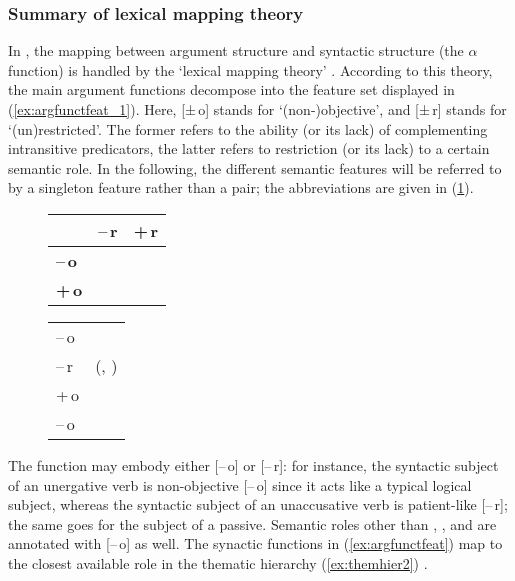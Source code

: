 \subsubsection{Summary of lexical mapping theory}

In \Lfg{}, the mapping between argument structure and syntactic structure (the
$\alpha$ function) is handled by the `lexical mapping theory'
\citep[324--348]{bresnan2016}. According to this theory, the main argument
functions decompose into the feature set displayed in
(\ref{ex:argfunctfeat_1}). Here, [±\,o] stands for `(non-)objective', and
[±\,r] stands for `(un)restricted'. The former refers to the ability (or its
lack) of complementing intransitive predicators, the latter refers to
restriction (or its lack) to a certain semantic role. In the following, the
different semantic features will be referred to by a singleton feature rather
than a pair; the abbreviations are given in (\ref{ex:argfunctfeat_2}).

\begin{figure}
\pex\label{ex:argfunctfeat}
\a\label{ex:argfunctfeat_1}%
	\begin{tabu}[t]{>{\bfseries}l c c}
	& \textbf{–\,r}
	& \textbf{+\,r}
	\\

	\midrule

	–\,o
	& \Subj
	& \Oblique
	\\

	+\,o
	& \Obj
	& \SObj
	\\

	\bottomrule
	\end{tabu}

\a\label{ex:argfunctfeat_2}%
	\begin{tabular}[t]{@{} l @{\quad$\mapsto$\quad} l}
	–\,o	&	\Subj\\
	–\,r	&	\Obj(, \Subj)\\
	+\,o	&	\SObj\\
	–\,o	&	\Oblique\\
	\end{tabular}
\xe
\end{figure}

The \Subj{} function may embody either [–\,o] or [–\,r]: for instance, the
syntactic subject of an unergative verb is non-objective [–\,o] since it acts
like a typical logical subject, whereas the syntactic subject of an
unaccusative verb is patient-like \mbox{[–\,r]}; the same goes for the subject
of a passive. Semantic roles other than \Subj{}, \Obj{}, and \SObj{} are
annotated with [–\,o] as well. The synactic functions in
(\ref{ex:argfunctfeat}) map to the closest available role in the thematic
hierarchy (\ref{ex:themhier2}) \citep[329]{bresnan2016}.

